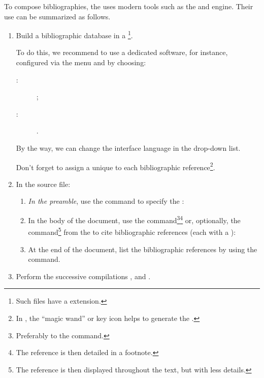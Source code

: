 \documentclass[english,nolocaltoc]{nwejmart}
\newtheorem[style=definition]{fact}
\newtheorem[title=experience]{experience}
\newtheorem[title-plural=rings]{ring}
\newtheorem[title=ideal,title-plural=ideals]{ideal}
\begin{document}
To compose bibliographies, the \nwejmauthorcl{} uses modern tools such
as the  and   engine. Their use can
be summarized as follows\autocite[for more details, see e.g.][in French]{Bitouze}.
\begin{enumerate}
\item Build a bibliographic database in a \footnote{Such
    files have a  extension.}.

  To do this, we recommend to use a dedicated software,
  \href{http://jabref.sourceforge.net/}{} for
  instance, configured via the menu
   and by choosing:
  \begin{description}
  \item[ :]  ;
  \item[ :] .
  \end{description}
  By the way, we can change the interface language in the
   drop-down list.

  Don't forget to assign a unique  to each bibliographic
  reference\footnote{In , the 
    \enquote{magic wand} or key icon helps to generate the  .}.
\item In the  source file: 
  \begin{enumerate}
  \item \emph{In the preamble}, use the 
    command to specify the :
\begin{preamblecode}[listing options={alsolanguage={[biblatex]TeX}}]
".bib}
\end{preamblecode}
  \item In the body of the document, use the 
    command\footnote{Preferably to the 
      command.}\footnote{The reference is then detailed in a
      footnote.}  or, optionally,  the 
    command\footnote{The reference is then displayed throughout the
      text, but with less details.} from the  to
    cite  bibliographic references (each with a ):
  \item At the end of the document, list the bibliographic
    references by using the  command.
  \end{enumerate}
\item Perform the successive compilations , 
  and 
  \suitecompilations.
\end{enumerate}
\end{document}

